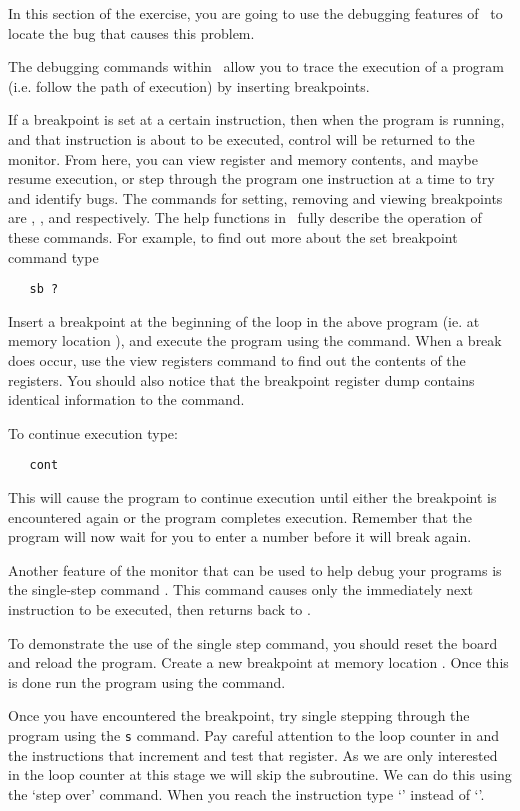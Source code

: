 In this section of the exercise, you are going to use the debugging 
features of \WRAMPmon\ to locate the bug that causes this problem.

The debugging commands within \WRAMPmon\ allow you to trace the execution 
of a program (i.e. follow the path of execution) by inserting breakpoints.

If a breakpoint is set at a certain instruction, then when the program
is running, and that instruction is about to be executed, control will
be returned to the monitor. From here, you can view register and
memory contents, and maybe resume execution, or step through the
program one instruction at a time to try and identify bugs. The
commands for setting, removing and viewing breakpoints are ,
, and  respectively. The help functions in \WRAMPmon\
fully describe the operation of these commands. For example, to find
out more about the set breakpoint command type
\begin{verbatim}
   sb ?
\end{verbatim}

Insert a breakpoint at the beginning of the loop in the above program 
(ie. at memory location \src{0x00004}), and execute the program using
the \src{go} command.
When a break does occur, use the view registers command to find out 
the contents of the registers. You should also notice that the breakpoint 
register dump contains identical information to the \src{vr} command.

To continue execution type:
\begin{verbatim}
   cont
\end{verbatim}
This will cause the program to continue execution until either the
breakpoint is encountered again or the program completes execution.
Remember that the program will now wait for you to enter a number
before it will break again.

Another feature of the monitor that can be used to help debug your programs
is the single-step command \src{s}. This command causes only the
immediately next instruction to be executed, then returns back to
\WRAMPmon.

To demonstrate the use of the single step command, you should reset the
board and reload the program. Create a new breakpoint at memory location
\src{0x00005}. Once this is done run the program using the \src{go}
command.

Once you have encountered the breakpoint, try single stepping through
the program using the \verb|s| command. Pay careful attention to the
loop counter in \reg{5} and the instructions that increment and test
that register. As we are only interested in the loop counter at this
stage we will skip the \src{readnum} subroutine. We can do this using
the `step over'  command. When you reach the instruction \src{jal
readnum} type `\src{so}' instead of `\src{s}'.

